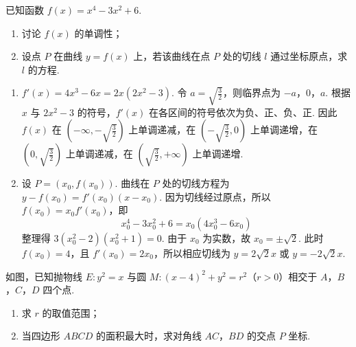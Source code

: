 \begin{problem}
已知函数 \( f(x) = x^4 - 3x^2 + 6 \).

\begin{enumerate}
\item 讨论 \( f(x) \) 的单调性；
\item 设点 \(P\) 在曲线 \(y = f(x)\) 上，若该曲线在点 \(P\) 处的切线 \(l\) 通过坐标原点，求 \(l\) 的方程.
\end{enumerate}
\end{problem}

\begin{solution}
\begin{enumerate}
\item \(f'(x)=4x^3-6x=2x(2x^2-3)\). 令 \(a=\sqrt{\frac{3}{2}}\)，则临界点为 \(-a\)，\(0\)，\(a\). 根据 \(x\) 与 \(2x^2-3\) 的符号，\(f'(x)\) 在各区间的符号依次为负、正、负、正. 因此 \(f(x)\) 在 \(\left(-\infty,-\sqrt{\frac{3}{2}}\right)\) 上单调递减，在 \(\left(-\sqrt{\frac{3}{2}},0\right)\) 上单调递增，在 \(\left(0,\sqrt{\frac{3}{2}}\right)\) 上单调递减，在 \(\left(\sqrt{\frac{3}{2}},+\infty\right)\) 上单调递增.

\item 设 \(P=(x_0,f(x_0))\). 曲线在 \(P\) 处的切线方程为 \(y-f(x_0)=f'(x_0)(x-x_0)\). 因为切线经过原点，所以 \(f(x_0)=x_0f'(x_0)\)，即
\[
x_0^4-3x_0^2+6=x_0(4x_0^3-6x_0)
\]
整理得 \(3(x_0^2-2)(x_0^2+1)=0\). 由于 \(x_0\) 为实数，故 \(x_0=\pm\sqrt{2}\). 此时 \(f(x_0)=4\)，且 \(f'(x_0)=2x_0\)，所以相应切线为 \(y=2\sqrt{2}x\) 或 \(y=-2\sqrt{2}x\).
\end{enumerate}
\end{solution}

\begin{problem}
如图，已知抛物线 \(E: y^{2} = x\) 与圆 \(M: (x - 4)^{2} + y^{2} = r^{2}\)（\(r > 0\)）相交于 \(A\)，\(B\)，\(C\)，\(D\) 四个点.

\begin{enumerate}
\item 求 \(r\) 的取值范围；
\item 当四边形 \(ABCD\) 的面积最大时，求对角线 \(AC\)，\(BD\) 的交点 \(P\) 坐标.
\end{enumerate}

\end{problem}


